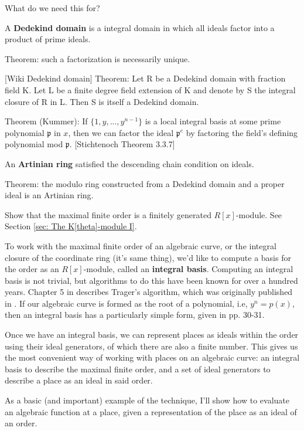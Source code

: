 \begin{mdframed}[backgroundcolor=cyan!20]
What do we need this for?

A {\bf Dedekind domain} is a integral domain in which all ideals factor into a product of prime ideals.

Theorem: such a factorization is necessarily unique.

[Wiki Dedekind domain] Theorem: Let R be a Dedekind domain with
fraction field K. Let L be a finite degree field extension of K and
denote by S the integral closure of R in L. Then S is itself a
Dedekind domain.

Theorem (Kummer): If $\{1,y,...,y^{n-1}\}$ is a local integral basis
at some prime polynomial $\mathfrak{p}$ in $x$, then we can factor
the ideal $\mathfrak{p}^e$ by factoring the field's defining
polynomial mod $\mathfrak{p}$. [Stichtenoch Theorem 3.3.7]

An {\bf Artinian ring} satisfied the descending chain condition on ideals.

Theorem: the modulo ring constructed from a Dedekind domain and a proper ideal is an Artinian ring.
\end{mdframed}

Show that the maximal finite order is a finitely generated $R[x]$-module.
See Section \ref{sec: The K[theta]-module I}.

To work with the maximal finite order of an algebraic curve, or the integral closure of the coordinate
ring (it's same thing), we'd like to compute a basis for the order as an $R[x]$-module, called
an {\bf integral basis}.  Computing an integral basis is not
trivial, but algorithms to do this have been known for over a hundred years.  Chapter 5
in \cite{alvanos} describes Trager's algorithm, which was originally published
in \cite{trager}.
If our algebraic curve is formed as the root of a polynomial, i.e, $y^n = p(x)$, then
an integral basis has a particularly simple form, given in \cite{trager} pp. 30-31.

Once we have an integral basis, we can represent places as ideals within the order
using their ideal generators, of which there are also a finite number.  This gives us the most convenient
way of working with places on an algebraic curve: an integral basis to describe the maximal
finite order, and a set of ideal generators to describe a place as an ideal in said order.

As a basic (and important) example of the technique, I'll show how to evaluate an algebraic function
at a place, given a representation of the place as an ideal of an order.

